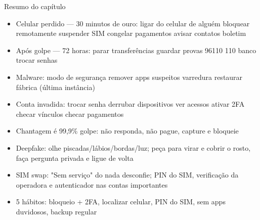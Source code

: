 \begin{tcbsummary}{Resumo do capítulo}
\begin{itemize}
  \item Celular perdido — 30 minutos de ouro: ligar do celular de alguém bloquear remotamente suspender SIM congelar pagamentos avisar contatos boletim
  \item Após golpe — 72 horas: parar transferências guardar provas 96110 110 banco trocar senhas
  \item Malware: modo de segurança remover apps suspeitos varredura restaurar fábrica (última instância)
  \item Conta invadida: trocar senha derrubar dispositivos ver acessos ativar 2FA checar vínculos checar pagamentos
  \item Chantagem é 99,9\% golpe: não responda, não pague, capture e bloqueie
  \item Deepfake: olhe piscadas/lábios/bordas/luz; peça para virar e cobrir o rosto, faça pergunta privada e ligue de volta
  \item SIM swap: "Sem serviço" do nada desconfie; PIN do SIM, verificação da operadora e autenticador nas contas importantes
  \item 5 hábitos: bloqueio + 2FA, localizar celular, PIN do SIM, sem apps duvidosos, backup regular
\end{itemize}

\end{tcbsummary}
